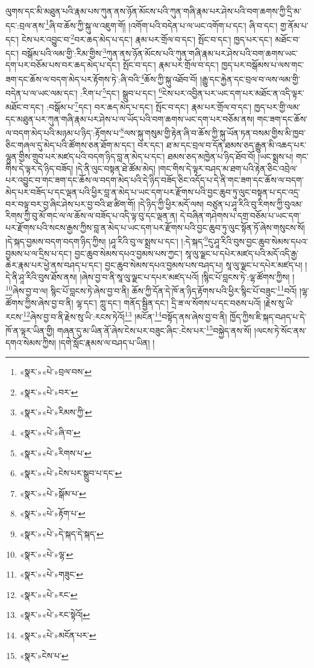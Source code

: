 ལུགས་དང་མི་མཐུན་པའི་རྣམ་པས་ཀུན་ནས་ཉོན་མོངས་པའི་ཀུན་གཞི་རྣམ་པར་ཤེས་པའི་བག་ཆགས་ཀྱི་དྲི་མ་དང་:བྲལ་ནས་\footnote{«སྣར་»«པེ་»བྲལ་བས་}ཞི་བ་ཆོས་ཀྱི་སྐུ་ལ་འཇུག་གོ། །འགོག་པའི་བདེན་པ་ལ་ཡང་འགོག་པ་དང་། ཞི་བ་དང་། གྱ་ནོམ་པ་དང་། ངེས་པར་འབྱུང་བ་\footnote{«སྣར་»«པེ་»བར་}བར་ཆད་མེད་པ་དང་། རྣམ་པར་གྲོལ་བ་དང་། སྤོང་བ་དང་། ཁྱད་པར་དང་། མཐོང་བ་དང་། བསྒོམ་པའི་ལམ་གྱི་:རིམ་གྱིས་\footnote{«སྣར་»«པེ་»རིམས་ཀྱི་}ཀུན་ནས་ཉོན་མོངས་པའི་ཀུན་གཞི་རྣམ་པར་ཤེས་པའི་བག་ཆགས་ཡང་དག་པར་བཅོམ་པས་བར་ཆད་མེད་པ་དང་། སྤོང་བ་དང་། རྣམ་པར་གྲོལ་བ་དང་། ཁྱད་པར་བསྒོམས་པ་ལས་གང་ཟག་དང་ཆོས་ལ་བདག་མེད་པར་རྟོགས་ཏེ་:ཞི་བའི་\footnote{«སྣར་»«པེ་»ཞི་བ་}ཆོས་ཀྱི་སྐུ་འཐོབ་བོ། །རྒྱུ་དང་རྐྱེན་དང་བྲལ་བ་ལས་ལམ་གྱི་བདེན་པ་ལ་ཡང་ལམ་དང་། :རིག་པ་\footnote{«སྣར་»«པེ་»རིགས་པ་}དང་། སྒྲུབ་པ་དང་། \footnote{«སྣར་»«པེ་»ངེས་པར་སྒྲུབ་པ་དང་}ངེས་པར་འབྱིན་པར་ཡང་དག་པར་མཐོང་ན་འདི་ལྟར་མཐོང་བ་དང་། :བསྒོམ་པ་\footnote{«སྣར་»«པེ་»སྒོམ་པ་}དང་། བར་ཆད་མེད་པ་དང་། སྤོང་བ་དང་། རྣམ་པར་གྲོལ་བ་དང་། ཁྱད་པར་གྱི་ལམ་དང་མཐུན་པར་ཀུན་གཞི་རྣམ་པར་ཤེས་པ་ལ་ཡོད་པའི་བག་ཆགས་ཡང་དག་པར་བཅོམ་ནས། གང་ཟག་དང་ཆོས་ལ་བདག་མེད་པའི་མཉམ་པ་ཉིད་:རྟོགས་པ་\footnote{«སྣར་»«པེ་»རྟོག་པ་}ལས་སྐུ་གསུམ་གྱི་རྟེན་ཞི་བ་ཆོས་ཀྱི་སྐུ་ཡོན་ཏན་བསམ་གྱིས་མི་ཁྱབ་ཅིང་གཞལ་དུ་མེད་པའི་ཚོགས་ཅན་ཐོག་མ་དང་། བར་དང་། ཐ་མ་དང་བྲལ་བ་དོན་ཐམས་ཅད་རྒྱུན་མི་འཆད་པར་ལྷུན་གྱིས་གྲུབ་པར་མཛད་པའི་བདག་ཉིད་བླ་ན་མེད་པ་དང་། ཐམས་ཅད་མཁྱེན་པ་ཉིད་ཐོབ་བོ། །ཡང་སྨྲས་པ། གང་གིས་དེ་ལྟར་དེ་ཉིད་བཟོད། །དེ་ནི་ལུང་བསྟན་ཐེ་ཚོམ་མེད། །གང་གིས་དེ་ལྟར་བཤད་མ་ཐག་པའི་རྟེན་ཅིང་འབྲེལ་པར་འབྱུང་བ་གང་ཟག་དང་ཆོས་ལ་བདག་མེད་པའི་དེ་ཉིད་བཟོད་ཅིང་འདོད་པ་དེ་ནི་གང་ཟག་དང་ཆོས་ལ་བདག་མེད་པར་བཟོད་པ་དང་ལྡན་པའི་ཕྱིར་བླ་ན་མེད་པ་ཡང་དག་པར་རྫོགས་པའི་བྱང་ཆུབ་ཏུ་ལུང་བསྟན་པ་དང་འདྲ་བར་བལྟ་བར་བྱ་ཞིང་ཤེས་པར་བྱ་བའི་ཐ་ཚིག་གོ། །དེ་ཉིད་ཀྱི་ཕྱིར་མདོ་ལས། བཙུན་པ་ཤཱ་རིའི་བུ་རིགས་ཀྱི་བུའམ་རིགས་ཀྱི་བུ་མོ་གང་ལ་ལ་ཆོས་ལ་བཟོད་པ་འདི་ལྟ་བུ་དང་ལྡན་ན། དེ་བཞིན་གཤེགས་པ་དགྲ་བཅོམ་པ་ཡང་དག་པར་རྫོགས་པའི་སངས་རྒྱས་ཀྱིས་བླ་ན་མེད་པ་ཡང་དག་པར་རྫོགས་པའི་བྱང་ཆུབ་ཏུ་ལུང་སྟོན་ཏོ་ཞེས་གསུངས་སོ། །དེ་སྐད་བྱམས་བདག་བདག་ཉིད་ཀྱིས། །ཤཱ་རིའི་བུ་ལ་སྨྲས་པ་དང་། །:དེ་སྐད་\footnote{«སྣར་»«པེ་»དེ་སྐད་དེ་སྐད་}དུ་ཤཱ་རིའི་བུས་བྱང་ཆུབ་སེམས་དཔའ་བྱམས་པ་ལ་དྲིས་པ་དང་། བྱང་ཆུབ་སེམས་དཔའ་བྱམས་པས་ཀྱང་། སཱ་ལུ་ལྗང་པ་དཔེར་མཛད་པའི་མདོ་འདི་རྒྱ་ཆེར་རྣམ་པར་ཕྱེ་ནས་བཤད་པ་དང་། བྱང་ཆུབ་སེམས་དཔའ་བྱམས་པས་བཤད་པ། སཱ་ལུ་ལྗང་པ་དཔེར་མཛད་པ། །དེ་ནི་ཤཱ་རིའི་བུས་ཐོས་ནས། །ཞེས་བྱ་བ་ནི་སཱ་ལུ་ལྗང་པ་དཔར་མཛད་པའོ། །སྙིང་པོ་བླངས་ཏེ་:ལྷ་ཚོགས་ཀྱིས། །\footnote{«སྣར་»«པེ་»ལྷ་}ཞེས་བྱ་བ་ལ། སྙིང་པོ་བླངས་ཏེ་ཞེས་བྱ་བ་ནི། ཆོས་ཀྱི་དོན་དེ་ཁོ་ན་ཉིད་རྟོགས་པའི་ཕྱིར་སྙིང་པོ་བཟུང་\footnote{«སྣར་»«པེ་»གཟུང་}བའོ། །ལྷ་ཚོགས་ཀྱིས་ཞེས་བྱ་བ་ནི། ལྷ་དང་། ཀླུ་དང་། གནོད་སྦྱིན་དང་། དྲི་ཟ་ལ་སོགས་པ་དང་བཅས་པའོ། །རྗེས་སུ་ཡི་རངས་\footnote{«སྣར་»«པེ་»རང་}ཞེས་བྱ་བ་ནི་རྗེས་སུ་ཡི་:རངས་ཏེའོ།\footnote{«སྣར་»«པེ་»རང་སྟེའོ།} །མངོན་\footnote{«སྣར་»«པེ་»མངོན་པར་}བསྟོད་ནས་ཞེས་བྱ་བ་ནི། ཁྱོད་ཀྱིས་ཇི་སྐད་བཤད་པ་དེ་ཁོ་ན་ལྟར་ཡིན་གྱི། གཞན་དུ་མ་ཡིན་ནོ་ཞེས་ངེས་པར་བཟུང་ཞིང་:ངེས་པར་\footnote{«སྣར་»ངེས་པ་}བསྐྱེད་ནས་སོ། །ལངས་ཏེ་སོང་ནས་དགའ་སེམས་ཀྱིས། །དགེ་སློང་རྣམས་ལ་བཤད་པ་ཡིན། །

